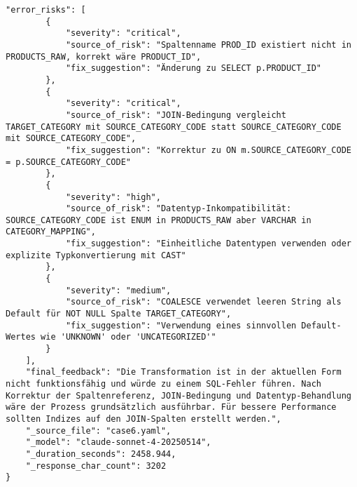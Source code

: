 \begin{lstlisting}[caption={Ausgabe: Claude Sonnet 4 Anwendungsfall 6 Robustheitsdurchlauf},label={claude_case6_prompt3}]
    "error_risks": [
        {
            "severity": "critical",
            "source_of_risk": "Spaltenname PROD_ID existiert nicht in PRODUCTS_RAW, korrekt wäre PRODUCT_ID",
            "fix_suggestion": "Änderung zu SELECT p.PRODUCT_ID"
        },
        {
            "severity": "critical",
            "source_of_risk": "JOIN-Bedingung vergleicht TARGET_CATEGORY mit SOURCE_CATEGORY_CODE statt SOURCE_CATEGORY_CODE mit SOURCE_CATEGORY_CODE",
            "fix_suggestion": "Korrektur zu ON m.SOURCE_CATEGORY_CODE = p.SOURCE_CATEGORY_CODE"
        },
        {
            "severity": "high",
            "source_of_risk": "Datentyp-Inkompatibilität: SOURCE_CATEGORY_CODE ist ENUM in PRODUCTS_RAW aber VARCHAR in CATEGORY_MAPPING",
            "fix_suggestion": "Einheitliche Datentypen verwenden oder explizite Typkonvertierung mit CAST"
        },
        {
            "severity": "medium",
            "source_of_risk": "COALESCE verwendet leeren String als Default für NOT NULL Spalte TARGET_CATEGORY",
            "fix_suggestion": "Verwendung eines sinnvollen Default-Wertes wie 'UNKNOWN' oder 'UNCATEGORIZED'"
        }
    ],
    "final_feedback": "Die Transformation ist in der aktuellen Form nicht funktionsfähig und würde zu einem SQL-Fehler führen. Nach Korrektur der Spaltenreferenz, JOIN-Bedingung und Datentyp-Behandlung wäre der Prozess grundsätzlich ausführbar. Für bessere Performance sollten Indizes auf den JOIN-Spalten erstellt werden.",
    "_source_file": "case6.yaml",
    "_model": "claude-sonnet-4-20250514",
    "_duration_seconds": 2458.944,
    "_response_char_count": 3202
}
\end{lstlisting}

